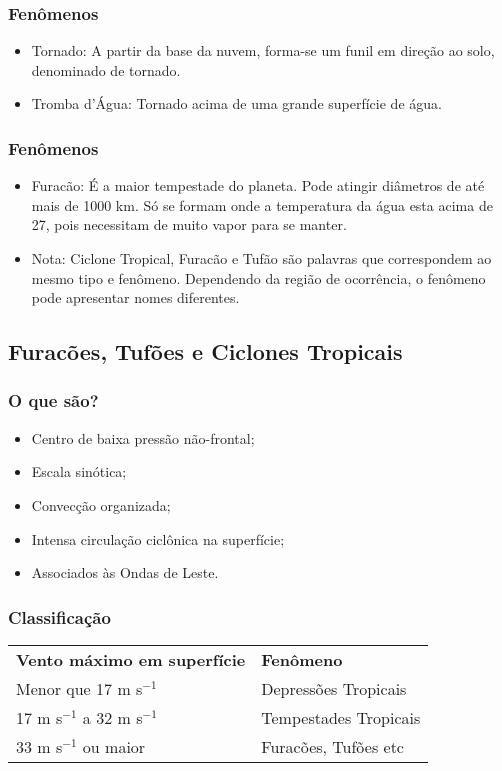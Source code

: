 \begin{frame}
\frametitle{Fenômenos}
\begin{itemize}[<+-| alert@+>]
  \item Tornado: A partir da base da nuvem, forma-se um funil em direção ao
        solo, denominado de tornado.
  \item Tromba d'Água: Tornado acima de uma grande superfície de água.
\end{itemize}
\end{frame}

\begin{frame}
\frametitle{Fenômenos}
\begin{itemize}[<+-| alert@+>]
  \item Furacão: É a maior tempestade do planeta.  Pode atingir diâmetros de até
        mais de 1000 km. Só se formam onde a temperatura da água esta acima de
        27\textcelsius{}, pois necessitam de muito vapor para se manter.
  \item Nota: Ciclone Tropical, Furacão e Tufão são palavras que correspondem ao
        mesmo tipo e fenômeno. Dependendo da região de ocorrência, o fenômeno
        pode apresentar nomes diferentes.
\end{itemize}
\end{frame}


\subsection{Furacões, Tufões e Ciclones Tropicais}
\begin{frame}
\frametitle{O que são?}
\begin{itemize}[<+-| alert@+>]
  \item Centro de baixa pressão não-frontal;
  \item Escala sinótica;
  \item Convecção organizada;
  \item Intensa circulação ciclônica na superfície;
  \item Associados às Ondas de Leste.
\end{itemize}
\end{frame}


\begin{frame}
\frametitle{Classificação}
\begin{table}[h]
  \begin{tabular}{l|l}
  \hline\hline
  {\bf Vento máximo em superfície} & {\bf Fenômeno}        \\
  Menor que 17 m s$^{-1}$          & Depressões Tropicais  \\
  17 m s$^{-1}$ a 32 m s$^{-1}$    & Tempestades Tropicais \\
  33 m s$^{-1}$ ou maior           & Furacões, Tufões etc  \\
  \hline
  \end{tabular}
\end{table}
\end{frame}

